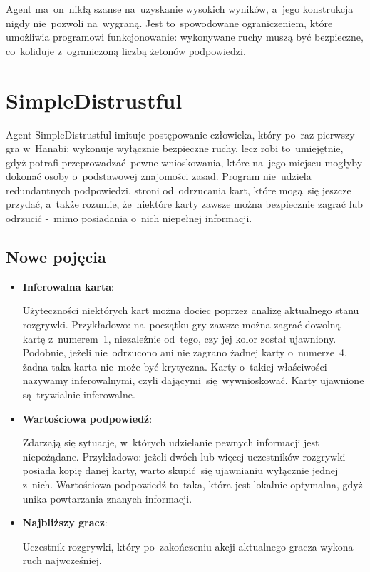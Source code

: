 \documentclass[declaration,shortabstract,inz]{iithesis}
\begin{document}
Agent ma~on~nikłą szanse na~uzyskanie wysokich wyników, a~jego konstrukcja nigdy nie~pozwoli na~wygraną. Jest to~spowodowane ograniczeniem, które umożliwia programowi funkcjonowanie: wykonywane ruchy muszą być bezpieczne, co~koliduje z~ograniczoną liczbą żetonów podpowiedzi.

\section{SimpleDistrustful}

Agent SimpleDistrustful imituje postępowanie człowieka, który po~raz pierwszy gra w~Hanabi: wykonuje wyłącznie bezpieczne ruchy, lecz robi to~umiejętnie, gdyż potrafi przeprowadzać pewne wnioskowania, które na~jego miejscu mogłyby dokonać osoby o~podstawowej znajomości zasad. Program nie~udziela redundantnych podpowiedzi, stroni od~odrzucania kart, które mogą~się jeszcze przydać, a~także rozumie, że~niektóre karty zawsze można bezpiecznie zagrać lub odrzucić -~mimo posiadania o~nich niepełnej informacji.

\subsection*{Nowe pojęcia}

\begin{itemize}
	\item \textbf{Inferowalna karta}:

	Użyteczności niektórych kart można dociec poprzez analizę aktualnego stanu rozgrywki. Przykładowo: na~początku gry zawsze można zagrać dowolną kartę z~numerem~1, niezależnie od~tego, czy jej kolor został ujawniony. Podobnie, jeżeli nie~odrzucono ani nie zagrano żadnej karty o~numerze~4, żadna taka karta nie~może być krytyczna. Karty o~takiej właściwości nazywamy inferowalnymi, czyli dającymi~się wywnioskować. Karty ujawnione są~trywialnie inferowalne.
	
	\item \textbf{Wartościowa podpowiedź}:
	
	Zdarzają się sytuacje, w~których udzielanie pewnych informacji jest niepożądane. Przykładowo: jeżeli dwóch lub więcej uczestników rozgrywki posiada kopię danej karty, warto skupić~się ujawnianiu wyłącznie jednej z~nich. Wartościowa podpowiedź to~taka, która jest lokalnie optymalna, gdyż unika powtarzania znanych informacji.
	
	\item \textbf{Najbliższy gracz}:
	
	Uczestnik rozgrywki, który po~zakończeniu akcji aktualnego gracza wykona ruch najwcześniej.
	
\end{itemize}
\end{document}
